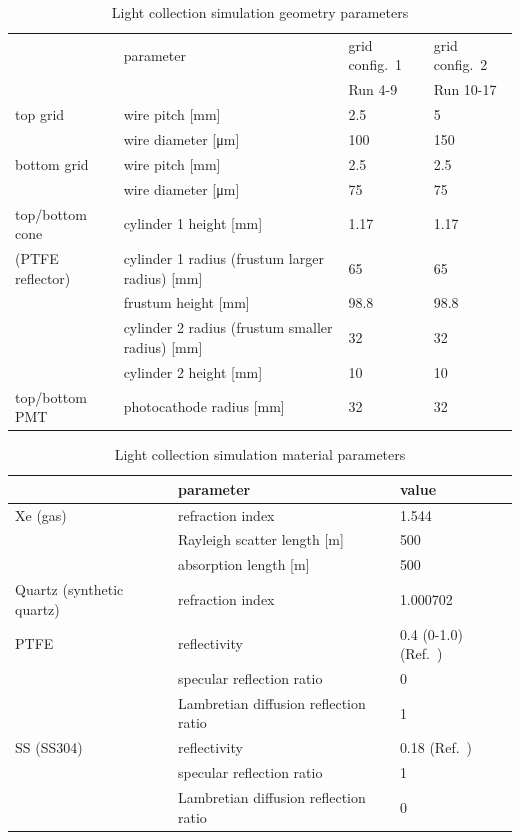 	\begin{table}[!h]
		\centering
		\begin{tabular}[!h]{ | m{8em} m{20.5em} || m{4.5em} | m{4.5em}|} 
			\hline
				&parameter & grid config.~1 & grid config.~2 \\
				& & Run 4-9 & Run 10-17  \\\hline\hline			
		    top grid & wire pitch [\si{\mm}] & 2.5	 & 5\\
		    			 & wire diameter [\si{\um}] &  100  & 150 \\\hline
		    bottom grid & wire pitch [\si{\mm}] & 2.5	 & 2.5 \\
		    			 & wire diameter [\si{\um}] &  75  & 75  \\\hline
		    top/bottom cone %
		                & cylinder 1 height [\si{\mm}] & 1.17 & 1.17 \\
		    (PTFE reflector) 		& cylinder 1 radius (frustum larger radius) [\si{\mm}] & 65 & 65 \\
		    			    & frustum height [\si{\mm}] & 98.8 & 98.8 \\
		    			& cylinder 2 radius (frustum smaller radius) [\si{\mm}] & 32 & 32 \\
		    			& cylinder 2 height [\si{\mm}] & 10 & 10 \\\hline
		    top/bottom PMT & photocathode radius [\si{\mm}] & 32 & 32 \\
		    \hline		    
		\end{tabular}
		\caption[Light collection simulation geometry parameters.]{Light collection simulation geometry parameters}
		\label{tab:LC sim parameter geo}
	\end{table}


	\begin{table}[!h]
		\centering
		\begin{tabular}[!h]{ | m{12em} m{16em} || m{10em}|} 
			\hline
			&parameter &    value \\\hline\hline
			Xe (gas)   
			& refraction index & 1.544 \\
			& Rayleigh scatter length [m] & 500 \\
							& absorption length [m] &	500  \\
							\hline
			Quartz (synthetic quartz)   
				& refraction index & 1.000702 \\
							\hline
			PTFE 	   
			& reflectivity & 0.4 (0-1.0) (Ref.~\cite{Feuerbacher1972}) \\
						  &	 specular reflection ratio & 0\\
						  & Lambretian diffusion reflection ratio & 1\\
						  \hline
			SS (SS304)   & reflectivity & 0.18 (Ref.~\cite{Feuerbacher1972}) \\
						& specular reflection ratio & 1\\
						& Lambretian diffusion reflection ratio & 0\\
			\hline    
		\end{tabular}
		\caption[Light collection simulation material parameters.]{Light collection simulation material parameters}
		\label{tab:LC sim parameter material}
	\end{table}

